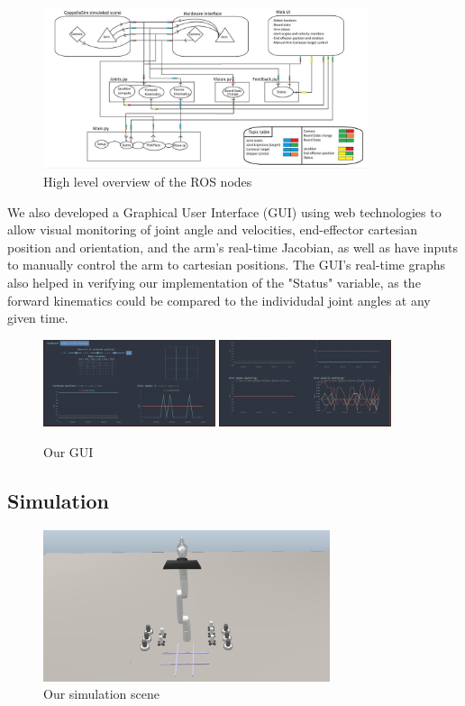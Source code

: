 \documentclass{article}
\begin{document}
\begin{figure}[h]
    \centering\includegraphics[width=0.85\textwidth]{diagram}
    \caption{High level overview of the ROS nodes}
\end{figure}

We also developed a Graphical User Interface (GUI) using web technologies to allow visual monitoring of joint angle and velocities, end-effector cartesian position and orientation, and the arm’s real-time Jacobian, as well as have inputs to manually control the arm to cartesian positions. The GUI's real-time graphs also helped in verifying our implementation of the "Status" variable, as the forward kinematics could be compared to the individudal joint angles at any given time.

\begin{figure}[h]
    \centering
    \includegraphics[width=0.45\textwidth]{website1}
    \includegraphics[width=0.45\textwidth]{website2}
    \caption{Our GUI}
\end{figure}


\subsection{Simulation}

\begin{figure}[H]
    \centering\includegraphics[width=0.75\textwidth]{scene}
    \caption{Our simulation scene}
\end{figure}
\end{document}
